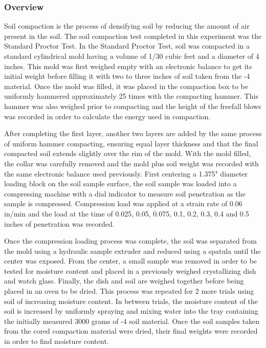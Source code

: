 \documentclass{article}
\begin{document}
\subsubsection{Overview}
\par Soil compaction is the process of densifying soil by reducing the amount of air present in the soil. The soil compaction test completed in this experiment was the Standard Proctor Test. In the Standard Proctor Test, soil was compacted in a standard cylindrical mold having a volume of 1/30 cubic feet and a diameter of 4 inches. This mold was first weighed empty with an electronic balance to get its initial weight before filling it with two to three inches of soil taken from the -4 material. Once the mold was filled, it was placed in the compaction box to be uniformly hammered approximately 25 times with the compacting hammer. This hammer was also weighed prior to compacting and the height of the freefall blows was recorded in order to calculate the energy used in compaction.  
\par After completing the first layer, another two layers are added by the same process of uniform hammer compacting, ensuring equal layer thickness and that the final compacted soil extends slightly over the rim of the mold. With the mold filled, the collar was carefully removed and the mold plus soil weight was recorded with the same electronic balance used previously. First centering a 1.375" diameter loading block on the soil sample surface, the soil sample was loaded into a compressing machine with a dial indicator to measure soil penetration as the sample is compressed. Compression load was applied at a strain rate of 0.06 in/min and the load at the time of 0.025, 0.05, 0.075, 0.1, 0.2, 0.3, 0.4 and 0.5 inches of penetration was recorded.  
\par Once the compression loading process was complete, the soil was separated from the mold using a hydraulic sample extruder and reduced using a spatula until the center was exposed. From the center, a small sample was removed in order to be tested for moisture content and placed in a previously weighed crystallizing dish and watch glass. Finally, the dish and soil are weighed together before being placed in an oven to be dried. This process was repeated for 2 more trials using soil of increasing moisture content. In between trials, the moisture content of the soil is increased by uniformly spraying and mixing water into the tray containing the initially measured 3000 grams of -4 soil material. Once the soil samples taken from the cored compaction material were dried, their final weights were recorded in order to find moisture content.  
\end{document}
